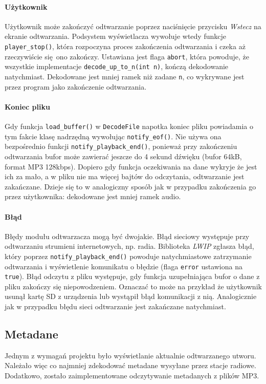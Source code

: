 \documentclass[12pt]{report}
\begin{document}
			\paragraph{Użytkownik}
				Użytkownik może zakończyć odtwarzanie poprzez naciśnięcie przycisku \textit{Wstecz} na ekranie odtwarzania. Podsystem wyświetlacza wywołuje wtedy funkcje \lstinline|player_stop()|, która rozpoczyna proces zakończenia odtwarzania i czeka aż rzeczywiście się ono zakończy. Ustawiana jest flaga \lstinline|abort|, która powoduje, że wszystkie implementacje \lstinline|decode_up_to_n(int n)|, kończą dekodowanie natychmiast. Dekodowane jest mniej ramek niż zadane \lstinline|n|, co wykrywane jest przez program jako zakończenie odtwarzania.
			
			\paragraph{Koniec pliku}
				Gdy funkcja \lstinline|load_buffer()| w \lstinline|DecodeFile| napotka koniec pliku powiadamia o tym fakcie klasę nadrzędną wywołując \lstinline|notify_eof()|. Nie używa ona bezpośrednio funkcji \lstinline|notify_playback_end()|, ponieważ przy zakończeniu odtwarzania bufor może zawierać jeszcze do 4 sekund dźwięku (bufor 64kB, format MP3 128kbps). Dopiero gdy funkcja oczekiwania na dane wykryje że jest ich za mało, a w pliku nie ma więcej bajtów do odczytania, odtwarzanie jest zakańczane. Dzieje się to w analogiczny sposób jak w przypadku zakończenia go przez użytkownika: dekodowane jest mniej ramek audio.
			
			\paragraph{Błąd}
				Błędy modułu odtwarzacza mogą być dwojakie. Błąd sieciowy występuje przy odtwarzaniu strumieni internetowych, np. radia. Biblioteka \textit{LWIP} zgłasza błąd, który poprzez \lstinline|notify_playback_end()| powoduje natychmiastowe zatrzymanie odtwarzania i wyświetlenie komunikatu o błędzie (flaga \lstinline|error| ustawiona na \lstinline|true|). Błąd odczytu z pliku występuje, gdy funkcja uzupełniająca bufor o dane z pliku zakończy się niepowodzeniem. Oznaczać to może na przykład że użytkownik usunął kartę SD z urządzenia lub wystąpił błąd komunikacji z nią. Analogicznie jak w przypadku błędu sieci odtwarzanie jest zakańczane natychmiast.
			
		\subsection{Metadane}
		Jednym z wymagań projektu było wyświetlanie aktualnie odtwarzanego utworu. Należało więc co najmniej zdekodować metadane wysyłane przez stacje radiowe. Dodatkowo, zostało zaimplementowane odczytywanie metadanych z plików MP3.
		
\end{document}

